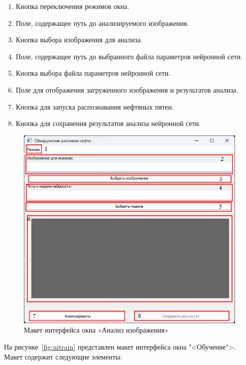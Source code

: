\begin{enumerate}
	\item Кнопка переключения режимов окна.
	\item Поле, содержащее путь до анализируемого изображения.
	\item Кнопка выбора изображения для анализа.
	\item Поле, содержащее путь до выбранного файла параметров нейронной сети.
	\item Кнопка выбора файла параметров нейронной сети.
	\item Поле для отображения загруженного изображения и результатов анализа.
	\item Кнопка для запуска распознавания нефтяных пятен. 
	\item Кнопка для сохранения результатов анализа нейронной сети.
\end{enumerate}

\begin{figure}[H]
	\centering
	\includegraphics[width=1\linewidth]{images/ui_analysis}
	\caption{Макет интерфейса окна «Анализ изображения»}
	\label{fig:uianalysis}
\end{figure}

На рисунке~\ref{fig:uitrain} представлен макет интерфейса окна "<Обучение">. Макет содержит следующие элементы:

